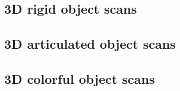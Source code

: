 \subsection{3D rigid object scans}
\label{subsec:3drigid}

\subsection{3D articulated object scans}
\label{subsec:3darticulated}

\subsection{3D colorful object scans}
\label{subsec:3dColored}
